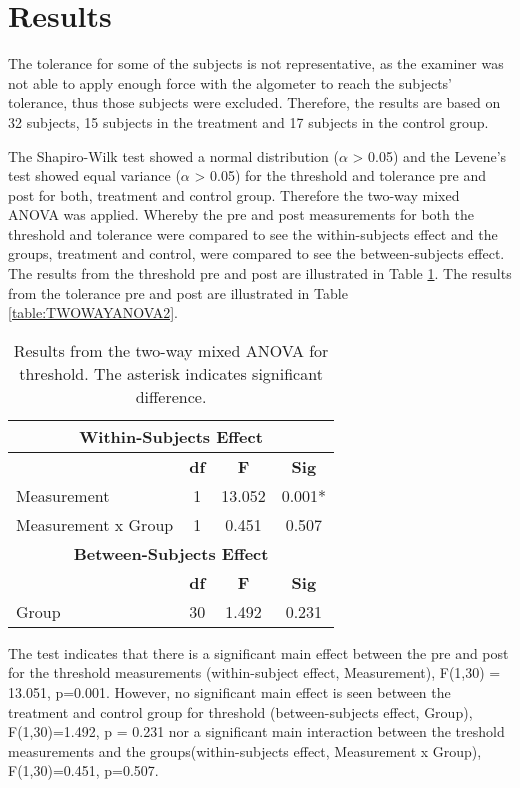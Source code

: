 \section{Results}
The tolerance for some of the subjects is not representative, as the examiner was not able to apply enough force with the algometer to reach the subjects' tolerance, thus those subjects were excluded. Therefore,
the results are based on 32 subjects, 15 subjects in the treatment and 17 subjects in the control group. 

The Shapiro-Wilk test showed a normal distribution ($\alpha$ > 0.05) and the Levene's test showed equal variance ($\alpha$ > 0.05) for the threshold and tolerance pre and post for both, treatment and control group. Therefore the two-way mixed ANOVA was applied. Whereby the pre and post measurements for both the threshold and tolerance were compared to see the within-subjects effect and the groups, treatment and control, were compared to see the between-subjects effect. The results from the threshold pre and post are illustrated in Table \ref{table:TWOWAYANOVA1}.   The results from the tolerance pre and post are illustrated in Table \ref{table:TWOWAYANOVA2}. 

\begin{table}[ht]
\caption{Results from the two-way mixed ANOVA for threshold. The asterisk indicates significant difference.}
\centering
\begin{tabular}{l c c c}
\toprule
\multicolumn{4}{c}{\textbf{Within-Subjects Effect}} \\
\midrule
& \textbf{df} &\textbf{F} & \textbf{Sig} \\ [0.5ex] %
\hline
Measurement & 1 & 13.052 &  0.001* \\
Measurement x Group & 1 & 0.451 & 0.507 \\
\toprule
\multicolumn{4}{c}{\textbf{Between-Subjects Effect}} \\
\midrule 
& \textbf{df} & \textbf{F} & \textbf{Sig} \\ [0.5ex] %
\hline
Group & 30 & 1.492 &  0.231 \\
\hline
\end{tabular}
\label{table:TWOWAYANOVA1}
\end{table}

\noindent
The test indicates that there is a significant main effect between the pre and post for the threshold measurements (within-subject effect, Measurement), F(1,30) = 13.051, p=0.001. However, no significant main effect is seen between the treatment and control group for threshold (between-subjects effect, Group), F(1,30)=1.492, p = 0.231 nor a significant main interaction between the treshold measurements and the groups(within-subjects effect, Measurement x Group), F(1,30)=0.451, p=0.507.

